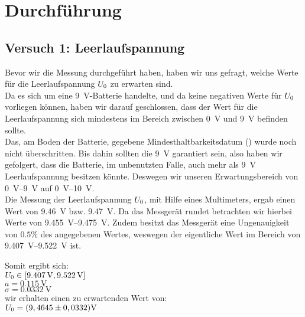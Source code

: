 \documentclass[11pt,a4paper,titlepage, ngerman]{article}
\begin{document}
\section{Durchführung}

	\subsection{Versuch 1: Leerlaufspannung}
	
		Bevor wir die Messung durchgeführt haben, haben wir uns gefragt, welche Werte für die Leerlaufspannung $ U_\textsc{0} $ zu erwarten sind. \\
		Da es sich um eine \SI{9}{\V}-Batterie handelte, und da keine negativen Werte für $ U_\textsc{0} $ vorliegen können, haben wir darauf geschlossen, dass der Wert für die Leerlaufspannung sich mindestens im Bereich zwischen \SI{0}{\V} und \SI{9}{\V} befinden sollte. \\
		Das, am Boden der Batterie, gegebene Mindesthaltbarkeitsdatum (\grqq) wurde noch nicht überschritten. Bis dahin sollten die \SI{9}{\V} garantiert sein, also haben wir gefolgert, dass die Batterie, im unbenutzten Falle, auch mehr als \SI{9}{\V} Leerlaufspannung besitzen könnte. Deswegen wir unseren Erwartungsbereich von \SIrange{0}{9}{\V} auf \SIrange{0}{10}{\V}. %
		\\ 
		Die Messung der Leerlaufspannung $ U_\textsc{0} $, mit Hilfe eines Multimeters, ergab einen Wert von \SI{9,46}{\V} bzw. \SI{9,47}{\V}. Da das Messgerät rundet betrachten wir hierbei Werte von \SIrange{9,455}{9,475}{\V}. Zudem besitzt das Messgerät eine Ungenauigkeit von $0.5\%$ des angegebenen Wertes, weswegen der eigentliche Wert im Bereich von \SIrange{9,407}{9,522}{\V} ist. \\
		
	\begin{flushleft}
			Somit ergibt sich: \\
		\vspace{0.5cm}
		$ U_\textsc{0} \in [\SI{9.407}{\V},\SI{9.522}{\V}]$\\
		$a = \SI{0.115}{\V}$ \\
		$\sigma = \SI{0,0332}{\V}$ \\
		\vspace{0.5cm}
		wir erhalten einen zu erwartenden Wert von: \\ 
		\vspace{0.5cm}
		$U_\textsc{0} = (9,4645\pm 0,0332)\si{\V}$  %
	\end{flushleft}
	
\end{document}
